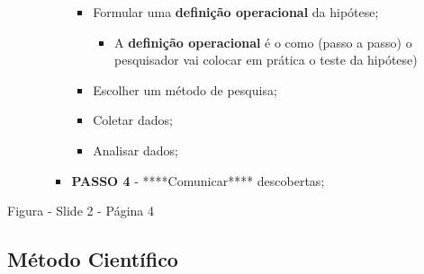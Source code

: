 \documentclass[
]{book}
\providecommand{\tightlist}{%
  \setlength{\itemsep}{0pt}\setlength{\parskip}{0pt}}
\begin{document}
\begin{itemize}
\begin{itemize}
\begin{itemize}
      \begin{itemize}
      \tightlist
      \item
        Formular uma \textbf{definição operacional} da hipótese;

        \begin{itemize}
        \tightlist
        \item
          A \textbf{definição operacional} é o como (passo a passo) o pesquisador vai colocar em prática o teste da hipótese)
        \end{itemize}
      \item
        Escolher um método de pesquisa;
      \item
        Coletar dados;
      \item
        Analisar dados;
      \end{itemize}
    \item
      \textbf{PASSO 4} - ****Comunicar**** descobertas;
    \end{itemize}
  \end{itemize}
\end{itemize}

Figura - Slide 2 - Página 4

\hypertarget{muxe9todo-cientuxedfico-1}{%
\subsection{Método Científico}\label{muxe9todo-cientuxedfico-1}}
\end{document}
